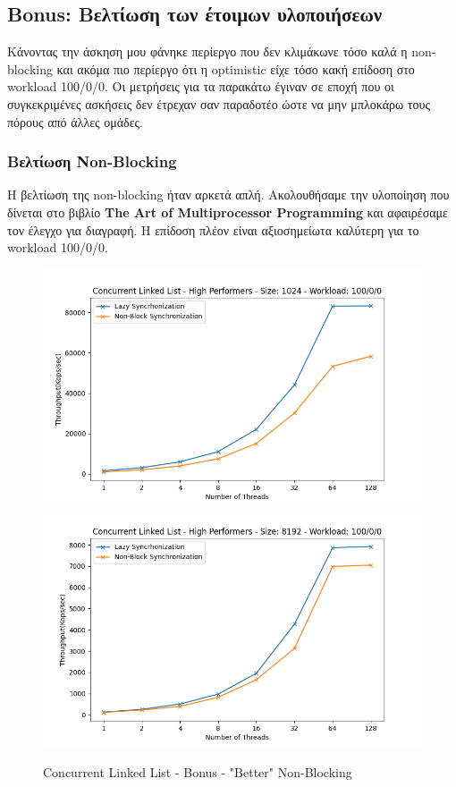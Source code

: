 \documentclass[../final_report.tex]{subfiles}
\begin{document}
\subsection{Bonus: Βελτίωση των έτοιμων υλοποιήσεων}

Κάνοντας την άσκηση μου φάνηκε περίεργο που δεν κλιμάκωνε τόσο καλά η non-blocking και ακόμα πιο περίεργο ότι η optimistic είχε τόσο κακή επίδοση
στο workload 100/0/0. Οι μετρήσεις για τα παρακάτω έγιναν σε εποχή που οι συγκεκριμένες ασκήσεις δεν έτρεχαν σαν παραδοτέο ώστε να μην μπλοκάρω τους
πόρους από άλλες ομάδες.

\subsubsection{Βελτίωση Non-Blocking}

Η βελτίωση της non-blocking ήταν αρκετά απλή. Ακολουθήσαμε την υλοποίηση που δίνεται στο βιβλίο \textbf{The Art of Multiprocessor Programming} και
αφαιρέσαμε τον έλεγχο για διαγραφή. Η επίδοση πλέον είναι αξιοσημείωτα καλύτερη για το workload 100/0/0.

\begin{figure}[H]
    \centering
        \includegraphics[scale=0.4]{outFiles/plots/concurrent_data_structs_custom_1024_100_0_0.png}
        \includegraphics[scale=0.4]{outFiles/plots/concurrent_data_structs_custom_8192_100_0_0.png}
    \caption{Concurrent Linked List - Bonus - "Better" Non-Blocking}
    \label{fig:Concurrent Linked List - Bonus - "Better" Non-Blocking}
\end{figure}
\end{document}

